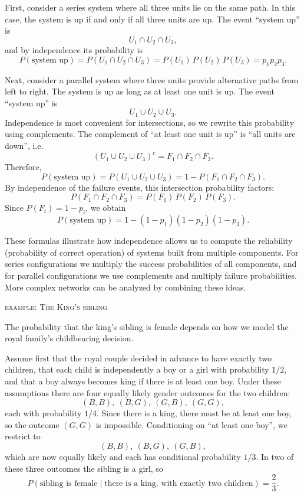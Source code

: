 First, consider a series system where all three units lie on the same path. In this case, the system is up if and only if all three units are up. The event “system up” is
\[
U_1 \cap U_2 \cap U_3,
\]
and by independence its probability is
\[
P(\text{system up}) = P(U_1 \cap U_2 \cap U_3)
= P(U_1)\,P(U_2)\,P(U_3)
= p_1 p_2 p_3.
\]

Next, consider a parallel system where three units provide alternative paths from left to right. The system is up as long as at least one unit is up. The event “system up” is
\[
U_1 \cup U_2 \cup U_3.
\]
Independence is most convenient for intersections, so we rewrite this probability using complements. The complement of “at least one unit is up” is “all units are down”, i.e.
\[
(U_1 \cup U_2 \cup U_3)^c = F_1 \cap F_2 \cap F_3.
\]
Therefore,
\[
P(\text{system up}) = P(U_1 \cup U_2 \cup U_3)
= 1 - P(F_1 \cap F_2 \cap F_3).
\]
By independence of the failure events, this intersection probability factors:
\[
P(F_1 \cap F_2 \cap F_3) = P(F_1)\,P(F_2)\,P(F_3).
\]
Since \(P(F_i) = 1 - p_i\), we obtain
\[
P(\text{system up}) = 1 - (1 - p_1)(1 - p_2)(1 - p_3).
\]

These formulas illustrate how independence allows us to compute the reliability (probability of correct operation) of systems built from multiple components. For series configurations we multiply the success probabilities of all components, and for parallel configurations we use complements and multiply failure probabilities. More complex networks can be analyzed by combining these ideas.


\newpage
\textsc{example: The King's sibling}


The probability that the king’s sibling is female depends on how we model the royal family’s childbearing decision.

Assume first that the royal couple decided in advance to have exactly two children, that each child is independently a boy or a girl with probability \(1/2\), and that a boy always becomes king if there is at least one boy. Under these assumptions there are four equally likely gender outcomes for the two children:
\[
(B,B),\ (B,G),\ (G,B),\ (G,G),
\]
each with probability \(1/4\). Since there is a king, there must be at least one boy, so the outcome \((G,G)\) is impossible. Conditioning on “at least one boy”, we restrict to
\[
(B,B),\ (B,G),\ (G,B),
\]
which are now equally likely and each has conditional probability \(1/3\). In two of these three outcomes the sibling is a girl, so
\[
P(\text{sibling is female} \mid \text{there is a king, with exactly two children}) = \frac{2}{3}.
\]

